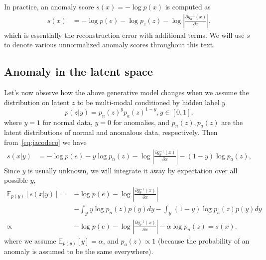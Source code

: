In practice, an anomaly score $s(x) = - \log p(x)$ is computed as
\begin{align}
s(x) & = - \log p(e) -\log p_{z}(z)-\log\left\vert \frac{\partial g_{\theta}^{-1}(x)}{\partial x}\right\vert ,\label{eq:jacodeco}
\end{align}
which is essentially the reconstruction error with additional terms. We will use $s$ to denote various unnormalized anomaly scores throughout this text.

\subsection{Anomaly in the latent space}
Let's now observe how the above generative model changes when we assume the distribution on latent $z$ to be multi-modal conditioned by hidden label $y$
\begin{equation} \label{eq:pzy}
p(z\vert y)=p_{n}(z)^{y}p_{a}(z)^{1-y},y\in[0,1],
\end{equation}
where $y=1$ for normal data, $y=0$ for anomalies, and $p_n(z),p_a(z)$ are the latent distributions of normal and anomalous data, respectively. Then from~\eqref{eq:jacodeco} we have
\begin{align*}
s(x \vert y) & = - \log p(e) -y\log p_{n}(z) - \log\left\vert \frac{\partial g_{\theta}^{-1}(x)}{\partial x}\right\vert -(1-y)\log p_{a}(z),
\end{align*}
Since $y$ is usually unknown, we will integrate it away by expectation over all possible $y$, 
\begin{align}
\mathbb{E}_{p(y)} \left[  s(x \vert y) \right]  = &  - \log p(e) - \log\left\vert \frac{\partial g_{\theta}^{-1}(x)}{\partial x}\right\vert \nonumber \\ 
 & - \int_{\mathcal{Y}} y\log p_{n}(z) p(y) dy - \int_{\mathcal{Y}} (1-y)\log p_{a}(z) p(y) dy \nonumber \\
   \propto & - \log p(e) - \log\left\vert \frac{\partial g_{\theta}^{-1}(x)}{\partial x}\right\vert  - \alpha\log p_{n}(z) = s(x). \label{eq:jacodeco2}
\end{align}
where we assume $\mathbb{E}_{p(y)} \left[  y \right] =\alpha$, and $p_{a}(z)\propto1$ (because the probability of an anomaly is assumed to be the same everywhere). 



